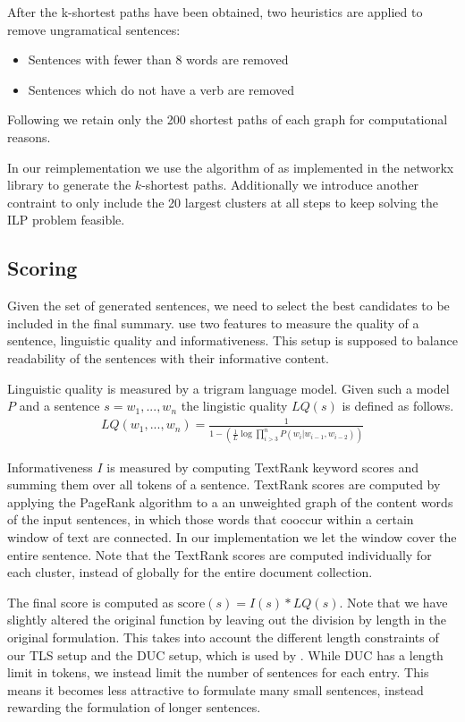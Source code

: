 \documentclass[a4paper,BCOR=10mm]{report}
\begin{document}
After the k-shortest paths have been obtained, two heuristics are applied to remove ungramatical sentences:

\begin{itemize}
    \item {Sentences with fewer than $8$ words are removed}
    \item {Sentences which do not have a verb  are removed}
\end{itemize}

Following \citet{banerjee} we retain only the 200 shortest paths of each graph for computational reasons.

In our reimplementation we use the algorithm of \citet{kshortestpath} as implemented in the networkx library \citep{networkx} to generate the $k$-shortest paths. Additionally we introduce another contraint to only include the 20 largest clusters at all steps to keep solving the ILP problem feasible.

\subsection{Scoring}

Given the set of generated sentences, we need to select the best candidates to be included in the final summary. \citet{banerjee} use two features to measure the quality of a sentence, linguistic quality and informativeness. This setup is supposed to balance readability of the sentences with their informative content.

Linguistic quality is measured by a trigram language model. Given such a model $P$ and a sentence $s = w_1, ..., w_n$ the lingistic quality $LQ(s)$ is defined as follows.
\begin{align*}
LQ(w_1, ..., w_n) = \frac{1}{1 - (\frac{1}{L} \log \prod_{i > 3}^{n} P(w_i | w_{i - 1}, w_{i - 2}))}
\end{align*}

Informativeness $I$ is measured by computing TextRank \citet{textrank} keyword scores and summing them over all tokens of a sentence.
TextRank scores are computed by applying the PageRank \citet{pagerank} algorithm to a an unweighted graph of the content words of the input sentences, in which those words that cooccur within a certain window of text are connected.
In our implementation we let the window cover the entire sentence.
Note that the TextRank scores are computed individually for each cluster, instead of globally for the entire document collection.

The final score is computed as $\text{score}(s) = I(s) * LQ(s)$. Note that we have slightly altered the original function by leaving out the division by length in the original formulation. This takes into account the different length constraints of our TLS setup and the DUC setup, which is used by \citeauthor{banerjee}. While DUC has a length limit in tokens, we instead limit the number of sentences for each entry.
This means it becomes less attractive to formulate many small sentences, instead rewarding the formulation of longer sentences.
\end{document}
